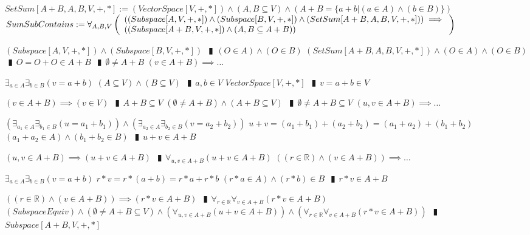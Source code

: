\documentclass{book}
\newcommand{\abr}{:=}
\newcommand{\pipe}{$\phantom{(}\vrectangleblack\phantom{)}$}
\newcommand{\pr}[1]{\left(#1\right)}
\begin{document}
\begin{shaded} %
$SetSum[A + B, A, B, V, +, *] \abr (VectorSpace[V, +, *]) \land (A, B \subseteq V) \land \pr{A + B = \{a + b | (a \in A) \land (b \in B)\}}$ \\

$SumSubContains \abr \forall_{A, B, V}\left(\begin{array}{ll}
  \pr{(Subspace[A, V, +, *]) \land (Subspace[B, V, +, *]) \land (SetSum[A + B, A, B, V, +, *])} \hfill \implies \hfill \\
  \pr{(Subspace[A + B, V, + ,*]) \land (A, B \subseteq A + B)}
\end{array}\right)$
\begin{enumerate}
  \lit $(Subspace[A, V, +, *]) \land (Subspace[B, V, +, *])$ \pipe $(O \in A) \land (O \in B)$
  \lit $(SetSum[A + B, A, B, V, +, *]) \land (O \in A) \land (O \in B)$ \pipe $O = O + O \in A + B$ \pipe $\emptyset \neq A + B$
  \lit $(v \in A + B) \implies \ldots$
  \begin{enumerate}
    \lit $\exists_{a \in A} \exists_{b \in B}(v = a + b)$
    \lit $(A \subseteq V) \land (B \subseteq V)$ \pipe $a, b \in V$
    \lit $VectorSpace[V, +, *]$ \pipe $v = a + b \in V$
  \end{enumerate}
  \lit $(v \in A + B) \implies (v \in V)$ \pipe $A + B \subseteq V$
  \lit $(\emptyset \neq A + B) \land (A + B \subseteq V)$ \pipe $\emptyset \neq A + B \subseteq V$
  \lit $(u, v \in A + B) \implies \ldots$
  \begin{enumerate}
    \lit $\pr{\exists_{a_1 \in A} \exists_{b_1 \in B}(u = a_1 + b_1)} \land \pr{\exists_{a_2 \in A} \exists_{b_2 \in B}(v = a_2 + b_2)}$
    \lit $u + v = (a_1 + b_1) + (a_2 + b_2) = (a_1 + a_2) + (b_1 + b_2)$
    \lit $(a_1 + a_2 \in A) \land (b_1 + b_2 \in B)$ \pipe $u + v \in A + B$
  \end{enumerate}
  \lit $(u, v \in A + B) \implies (u + v \in A + B)$ \pipe $\forall_{u, v \in A + B}(u + v \in A + B)$
  \lit $\pr{(r \in \mathbb{R}) \land (v \in A + B)} \implies \ldots$
  \begin{enumerate}
    \lit $\exists_{a \in A} \exists_{b \in B}(v = a + b)$
    \lit $r * v = r * (a + b) = r * a + r * b$
    \lit $(r * a \in A) \land (r * b) \in B$ \pipe $r * v \in A + B$
  \end{enumerate}
  \lit $\pr{(r \in \mathbb{R}) \land (v \in A + B)} \implies (r * v \in A + B)$ \pipe $\forall_{r \in \mathbb{R}} \forall_{v \in A + B}(r * v \in A + B)$
  \lit $(SubspaceEquiv) \land (\emptyset \neq A + B \subseteq V) \land \pr{\forall_{u, v \in A + B}(u + v \in A + B)} \land \pr{\forall_{r \in \mathbb{R}} \forall_{v \in A + B}(r * v \in A + B)}$ \pipe $Subspace[A + B, V, + ,*]$

\end{enumerate}
\end{shaded}
\end{document}
